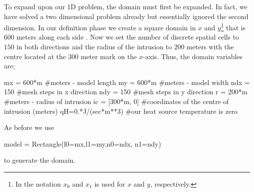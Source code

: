 To expand upon our 1D problem, the domain must first be expanded. In fact, we
have solved a two dimensional problem already but essentially ignored the second
dimension. In our definition phase we create a square domain in $x$ and
$y$\footnote{In \esc the notation
$x_{0}$ and $x_{1}$ is used for $x$ and $y$, respectively.}
that is $600$ meters along each side . Now we set the
number of discrete spatial cells to $150$ in both directions and the radius of
the intrusion to $200$ meters with the centre located at the $300$ meter mark
on the $x$-axis. Thus, the domain variables are;
\begin{python}
mx = 600*m #meters - model length
my = 600*m #meters - model width
ndx = 150 #mesh steps in x direction 
ndy = 150 #mesh steps in y direction
r = 200*m #meters - radius of intrusion
ic = [300*m, 0] #coordinates of the centre of intrusion (meters)
qH=0.*J/(sec*m**3) #our heat source temperature is zero
\end{python}
As before we use 
\begin{python}
model = Rectangle(l0=mx,l1=my,n0=ndx, n1=ndy)
\end{python}
to generate the domain. 

